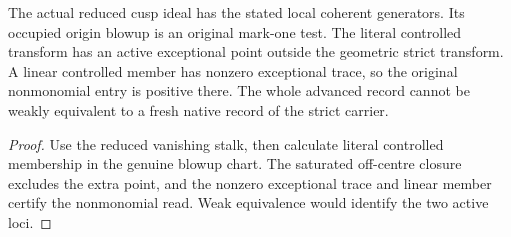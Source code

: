 \begin{theorem}
\label{hir:g8-reduced-controlled-cusp-obstruction}
\leanok
The actual reduced cusp ideal has the stated local coherent
generators. Its occupied origin blowup is an original mark-one
test. The literal controlled transform has an active exceptional
point outside the geometric strict transform. A linear controlled
member has nonzero exceptional trace, so the original
nonmonomial entry is positive there. The whole advanced
record cannot be weakly equivalent to a fresh native record
of the strict carrier.
\end{theorem}
\begin{proof}
Use the reduced vanishing stalk, then calculate literal
controlled membership in the genuine blowup chart. The
saturated off-centre closure excludes the extra point,
and the nonzero exceptional trace and linear member certify
the nonmonomial read. Weak equivalence would identify the
two active loci.
\end{proof}


